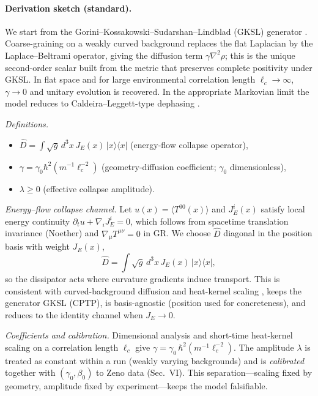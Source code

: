 \documentclass[aps,prl,twocolumn,nofootinbib]{revtex4-2}
\begin{document}
\paragraph*{Derivation sketch (standard).}
We start from the Gorini--Kossakowski--Sudarshan--Lindblad (GKSL) generator \cite{GKS1976,Lindblad1976,BreuerBook}.
Coarse-graining on a weakly curved background replaces the flat Laplacian by the Laplace--Beltrami operator, giving the diffusion term $\gamma \nabla^2\rho$; this is the unique second-order scalar built from the metric that preserves complete positivity under GKSL. In flat space and for large environmental correlation length $\ell_c\to\infty$, $\gamma\to 0$ and unitary evolution is recovered. In the appropriate Markovian limit the model reduces to Caldeira--Leggett-type dephasing \cite{CaldeiraLeggett1983,CaldeiraLeggett1985}.

\noindent\textit{Definitions.}
\begin{itemize}
  \item $\hat{D} = \int \!\sqrt{g}\, d^3x\, J_E(x)\, |x\rangle\langle x|$ (energy-flow collapse operator),
  \item $\gamma = \gamma_0 \hbar^2 (m^{-1}\ell_c^{-2})$ (geometry-diffusion coefficient; $\gamma_0$ dimensionless),
  \item $\lambda \ge 0$ (effective collapse amplitude).
\end{itemize}

\noindent\textit{Energy--flow collapse channel.}
Let $u(x)=\langle T^{00}(x)\rangle$ and $J_E^i(x)$ satisfy local energy continuity
$\partial_t u + \nabla_i J_E^i = 0$, which follows from spacetime translation invariance (Noether) and $\nabla_\mu T^{\mu\nu}=0$ in GR. We choose $\hat D$ diagonal in the position basis with weight $J_E(x)$,
\[
\hat D=\int \sqrt{g}\,d^3x\, J_E(x)\,|x\rangle\langle x|,
\]
so the dissipator acts where curvature gradients induce transport. This is consistent with curved-background diffusion and heat-kernel scaling \cite{WaldGR,BirrellDavies,Vassilevich2003}, keeps the generator GKSL (CPTP), is basis-agnostic (position used for concreteness), and reduces to the identity channel when $J_E\!\to\!0$.

\noindent\textit{Coefficients and calibration.}
Dimensional analysis and short-time heat-kernel scaling on a correlation length $\ell_c$ give
$\gamma=\gamma_0\,\hbar^2(m^{-1}\ell_c^{-2})$. The amplitude $\lambda$ is treated as constant within a run (weakly varying backgrounds) and is
\textit{calibrated} together with $(\gamma_0,\beta_0)$ to Zeno data (Sec.~VI). This separation---scaling fixed by geometry, amplitude fixed by experiment---keeps the model falsifiable.
\end{document}
